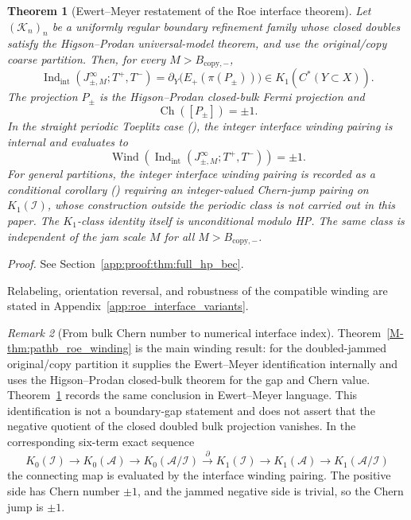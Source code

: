 \documentclass[11pt]{article}
\numberwithin{equation}{section}
\newtheorem{theorem}{Theorem}[section]
\theoremstyle{definition}
\theoremstyle{remark}
\newtheorem{remark}[theorem]{Remark}
\newcommand{\proofref}[1]{%
  \par\noindent\emph{Proof.} See Section~\ref{#1}.\par\medskip
}
\newcommand{\proofappendixref}[1]{\proofref{#1}}
\newcommand{\K}{\mathcal{K}}
\newcommand{\Indint}{\operatorname{Ind}_{\mathrm{int}}}
\newcommand{\Ch}{\operatorname{Ch}}
\begin{document}
\begin{theorem}[Ewert--Meyer restatement of the Roe interface theorem]\label{thm:full_hp_bec}
Let \((\K_n)_n\) be a uniformly regular boundary refinement family whose closed doubles satisfy the
Higson--Prodan universal-model theorem, and use the original/copy coarse partition. Then, for every
\(M>B_{\mathrm{copy},-}\),
\[
\Indint(J_{\pm,M}^\infty;T^+,T^-)
=
\partial_Y\!\bigl(E_+(\pi(P_\pm))\bigr)
\in K_1(C^*(Y\subset X)).
\]
The projection \(P_\pm\) is the Higson--Prodan closed-bulk Fermi projection and
\[
\Ch([P_\pm])=\pm1.
\]
In the straight periodic Toeplitz case (), the integer interface
winding pairing is internal and evaluates to
\[
\operatorname{Wind}\!\left(
\Indint(J_{\pm,M}^\infty;T^+,T^-)
\right)
=\pm1.
\]
For general partitions, the integer interface winding pairing is recorded as a conditional
corollary () requiring an integer-valued Chern-jump
pairing on \(K_1(\mathcal I)\), whose construction outside the periodic class is not carried
out in this paper. The \(K_1\)-class identity itself is unconditional modulo HP.  The same
class is independent of the jam scale \(M\) for all \(M>B_{\mathrm{copy},-}\).
\end{theorem}
\proofappendixref{app:proof:thm:full_hp_bec}




Relabeling, orientation reversal, and robustness of the compatible winding are stated in Appendix~\ref{app:roe_interface_variants}.

\begin{remark}[From bulk Chern number to numerical interface index]\label{rem:chern_to_interface}
Theorem~\ref{M-thm:pathb_roe_winding} is the main winding result: for the doubled-jammed
original/copy partition it supplies the Ewert--Meyer identification internally and uses the
Higson--Prodan closed-bulk theorem for the gap and Chern value. Theorem~\ref{thm:full_hp_bec}
records the same conclusion in Ewert--Meyer language. This identification is not a boundary-gap
statement and does not assert that the negative quotient of the closed doubled bulk projection
vanishes. In the corresponding six-term exact
sequence
\[
K_0(\mathcal I)\to K_0(\mathcal A)\to K_0(\mathcal A/\mathcal I)
\xrightarrow{\;\partial\;}
K_1(\mathcal I)\to K_1(\mathcal A)\to K_1(\mathcal A/\mathcal I)
\]
the connecting map is evaluated by the interface winding pairing. The positive side has Chern
number \(\pm1\), and the jammed negative side is trivial, so the Chern jump is \(\pm1\).
\end{remark}
\end{document}
